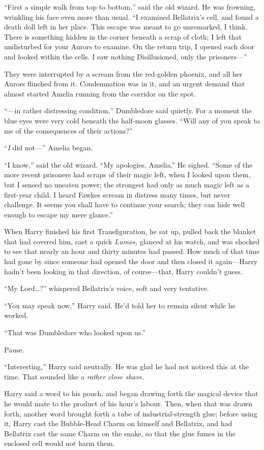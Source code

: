 “First a simple walk from top to bottom,” said the old wizard. He was frowning, wrinkling his face even more than usual. “I examined Bellatrix’s cell, and found a death doll left in her place. This escape was meant to go unremarked, I think. There is something hidden in the corner beneath a scrap of cloth; I left that undisturbed for your Aurors to examine. On the return trip, I opened each door and looked within the cells. I saw nothing Disillusioned, only the prisoners—”

They were interrupted by a scream from the red-golden phoenix, and all her Aurors flinched from it. Condemnation was in it, and an urgent demand that almost started Amelia running from the corridor on the spot.

“—in rather distressing condition,” Dumbledore said quietly. For a moment the blue eyes were very cold beneath the half-moon glasses. “Will any of you speak to me of the consequences of their actions?”

“\emph{I} did not—” Amelia began.

“I know,” said the old wizard. “My apologies, Amelia.” He sighed. “Some of the more recent prisoners had scraps of their magic left, when I looked upon them, but I sensed no uneaten power; the strongest had only as much magic left as a first-year child. I heard Fawkes scream in distress many times, but never challenge. It seems you shall have to continue your search; they can hide well enough to escape my mere glance.”

\later

When Harry finished his first Transfiguration, he sat up, pulled back the blanket that had covered him, cast a quick \emph{Lumos,} glanced at his watch, and was shocked to see that nearly an hour and thirty minutes had passed. How much of that time had gone by since someone had opened the door and then closed it again—Harry hadn’t been looking in that direction, of course—that, Harry couldn’t guess.

“My Lord…?” whispered Bellatrix’s voice, soft and very tentative.

“You may speak now,” Harry said. He’d told her to remain silent while he worked.

“That was Dumbledore who looked upon us.”

Pause.

“Interesting,” Harry said neutrally. He was glad he had not noticed this at the time. That sounded like a \emph{rather close shave}.

Harry said a word to his pouch, and began drawing forth the magical device that he would mate to the product of his hour’s labour. Then, when that was drawn forth, another word brought forth a tube of industrial-strength glue; before using it, Harry cast the Bubble-Head Charm on himself and Bellatrix, and had Bellatrix cast the same Charm on the snake, so that the glue fumes in the enclosed cell would not harm them.

